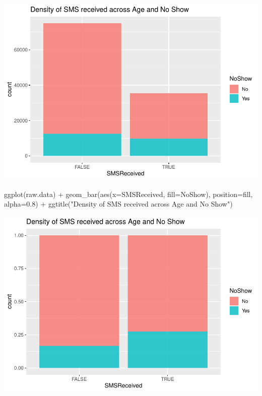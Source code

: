 \documentclass[
]{article}
\newenvironment{Shaded}{\begin{snugshade}}{\end{snugshade}}
\newcommand{\AttributeTok}[1]{\textcolor[rgb]{0.77,0.63,0.00}{#1}}
\newcommand{\FloatTok}[1]{\textcolor[rgb]{0.00,0.00,0.81}{#1}}
\newcommand{\FunctionTok}[1]{\textcolor[rgb]{0.00,0.00,0.00}{#1}}
\newcommand{\NormalTok}[1]{#1}
\newcommand{\SpecialCharTok}[1]{\textcolor[rgb]{0.00,0.00,0.00}{#1}}
\newcommand{\StringTok}[1]{\textcolor[rgb]{0.31,0.60,0.02}{#1}}
\begin{document}
\begin{center}\includegraphics{lab1_medical_databases_files/figure-latex/unnamed-chunk-9-1} \end{center}

\begin{Shaded}
\begin{Highlighting}[]
\FunctionTok{ggplot}\NormalTok{(raw.data) }\SpecialCharTok{+} 
  \FunctionTok{geom\_bar}\NormalTok{(}\FunctionTok{aes}\NormalTok{(}\AttributeTok{x=}\NormalTok{SMSReceived, }\AttributeTok{fill=}\NormalTok{NoShow), }\AttributeTok{position=}\StringTok{\textquotesingle{}fill\textquotesingle{}}\NormalTok{, }\AttributeTok{alpha=}\FloatTok{0.8}\NormalTok{) }\SpecialCharTok{+} 
  \FunctionTok{ggtitle}\NormalTok{(}\StringTok{"Density of SMS received across Age and No Show"}\NormalTok{)}
\end{Highlighting}
\end{Shaded}

\begin{center}\includegraphics{lab1_medical_databases_files/figure-latex/unnamed-chunk-9-2} \end{center}
\end{document}
